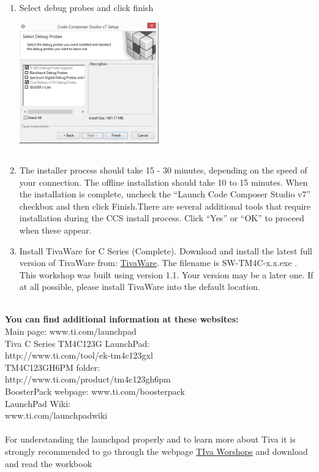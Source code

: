 \documentclass[a4paper,10pt,oneside]{article}
\begin{document}
{\begin{enumerate}
					\item Select debug probes and click finish \\
							{\centering
							\includegraphics[width=6cm, height=6cm]{CCSInstall4}}
					\item The installer process	should take 15 - 30 minutes, depending on the speed of your connection. The offline
					installation should take 10 to 15 minutes. When the installation is complete, uncheck the
					“Launch Code Composer Studio v7” checkbox and then click Finish.There are several additional tools that require installation during the CCS install process. Click “Yes” or “OK” to proceed when these appear. \\
					\item Install TivaWare for C Series (Complete). Download and install the latest full version of TivaWare from: \href{http://www.ti.com/tool/sw-tm4c}{TivaWare}. The filename is SW-TM4C-x.x.exe . This
					workshop was built using version 1.1. Your version may be a later one. If at all possible,
					please install TivaWare into the default location.
				\end{enumerate}}
				{\large \textbf{\\You can find additional information at these websites:}\\
				Main page: www.ti.com/launchpad\\
				Tiva C Series TM4C123G LaunchPad:\\ http://www.ti.com/tool/ek-tm4c123gxl\\
				TM4C123GH6PM folder:\\ http://www.ti.com/product/tm4c123gh6pm\\
				BoosterPack webpage: www.ti.com/boosterpack\\
				LaunchPad Wiki:\\ www.ti.com/launchpadwiki\\}	\\	
				{\Large For understanding the launchpad properly and to learn more about Tiva it is strongly recommended to go through the webpage \href{http://processors.wiki.ti.com/index.php/Getting_Started_with_the_TIVA\%E2\%84\%A2_C_Series_TM4C123G_LaunchPad}{TIva Worshops} and download and read the workbook }
\end{document}
